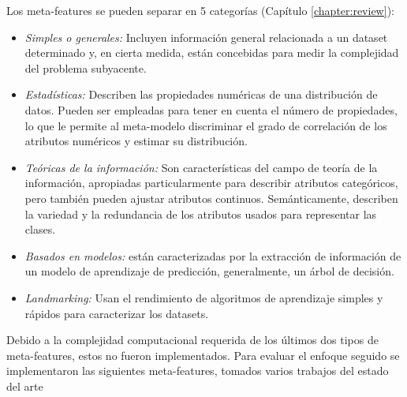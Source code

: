 
Los meta-features se pueden separar en 5 categorías \cite{bradzil2009metalearning} (Capítulo \ref{chapter:review}):

\begin{itemize}
	\item \textit{Simples o generales:} Incluyen información general relacionada a un dataset determinado y, en cierta medida, están concebidas para medir la complejidad del problema subyacente.
	\item \textit{Estadísticas:} Describen las propiedades numéricas de una distribución de datos. Pueden ser empleadas para tener en cuenta el número de propiedades, lo que le permite al meta-modelo discriminar el grado de correlación de los atributos numéricos y estimar su distribución.
	\item \textit{Teóricas de la información:} Son características del campo de teoría de la información, apropiadas particularmente para describir atributos categóricos, pero también pueden ajustar atributos continuos. Semánticamente, describen la variedad y la redundancia de los atributos usados para representar las clases.
	\item \textit{Basados en modelos:} están caracterizadas por la extracción de información de un modelo de aprendizaje de predicción, generalmente, un árbol de decisión.
	\item \textit{Landmarking:} Usan el rendimiento de algoritmos de aprendizaje simples y rápidos para caracterizar los datasets.
\end{itemize}

Debido a la complejidad computacional requerida de los últimos dos tipos de meta-features, estos no fueron implementados. Para evaluar el enfoque seguido se implementaron las siguientes meta-features, tomados varios trabajos del estado del arte \cite{castiello2005metadata, fuerer2015efficient}

